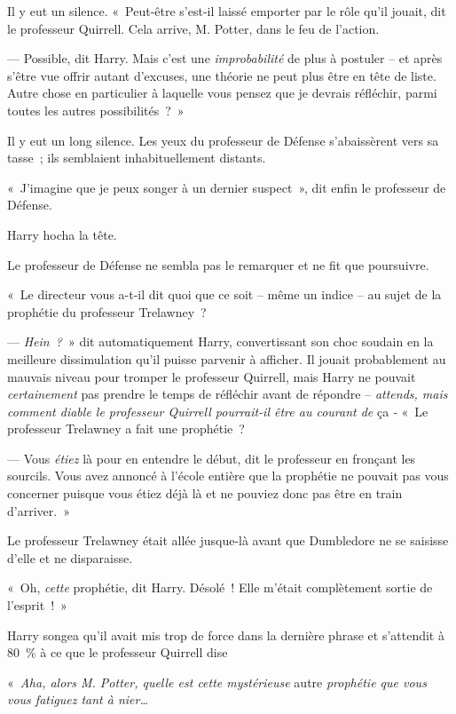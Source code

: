 Il y eut un silence. «~Peut-être s'est-il laissé emporter par le rôle qu'il jouait, dit le professeur Quirrell. Cela arrive, M. Potter, dans le feu de l'action.

--- Possible, dit Harry. Mais c'est une \emph{improbabilité} de plus à postuler -- et après s'être vue offrir autant d'excuses, une théorie ne peut plus être en tête de liste. Autre chose en particulier à laquelle vous pensez que je devrais réfléchir, parmi toutes les autres possibilités~?~»

Il y eut un long silence. Les yeux du professeur de Défense s'abaissèrent vers sa tasse~; ils semblaient inhabituellement distants.

«~J'imagine que je peux songer à un dernier suspect~», dit enfin le professeur de Défense.

Harry hocha la tête.

Le professeur de Défense ne sembla pas le remarquer et ne fit que poursuivre.

«~Le directeur vous a-t-il dit quoi que ce soit -- même un indice -- au sujet de la prophétie du professeur Trelawney~?

--- \emph{Hein~?}~» dit automatiquement Harry, convertissant son choc soudain en la meilleure dissimulation qu'il puisse parvenir à afficher. Il jouait probablement au mauvais niveau pour tromper le professeur Quirrell, mais Harry ne pouvait \emph{certainement} pas prendre le temps de réfléchir avant de répondre -- \emph{attends, mais comment diable le professeur Quirrell pourrait-il être au courant de} ça \emph{-} «~Le professeur Trelawney a fait une prophétie~?

--- Vous \emph{étiez} là pour en entendre le début, dit le professeur en fronçant les sourcils. Vous avez annoncé à l'école entière que la prophétie ne pouvait pas vous concerner puisque vous étiez déjà là et ne pouviez donc pas être en train d'arriver.~»


Le professeur Trelawney était allée jusque-là avant que Dumbledore ne se saisisse d'elle et ne disparaisse.

«~Oh, \emph{cette} prophétie, dit Harry. Désolé~! Elle m'était complètement sortie de l'esprit~!~»

Harry songea qu'il avait mis trop de force dans la dernière phrase et s'attendit à 80~\% à ce que le professeur Quirrell dise

«~\emph{Aha, alors M. Potter, quelle est cette mystérieuse} autre \emph{prophétie que vous vous fatiguez tant à nier…}

